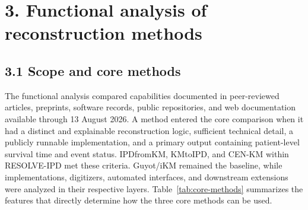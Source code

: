 \documentclass[12pt,letterpaper]{article}
\begin{document}
\section*{3. Functional analysis of reconstruction methods}

\subsection*{3.1 Scope and core methods}

The functional analysis compared capabilities documented in peer-reviewed articles, preprints, software records, public repositories, and web documentation available through 13 August 2026. A method entered the core comparison when it had a distinct and explainable reconstruction logic, sufficient technical detail, a publicly runnable implementation, and a primary output containing patient-level survival time and event status. IPDfromKM, KMtoIPD, and CEN-KM within RESOLVE-IPD met these criteria. Guyot/iKM remained the baseline, while implementations, digitizers, automated interfaces, and downstream extensions were analyzed in their respective layers. Table~\ref{tab:core-methods} summarizes the features that directly determine how the three core methods can be used.
\end{document}
